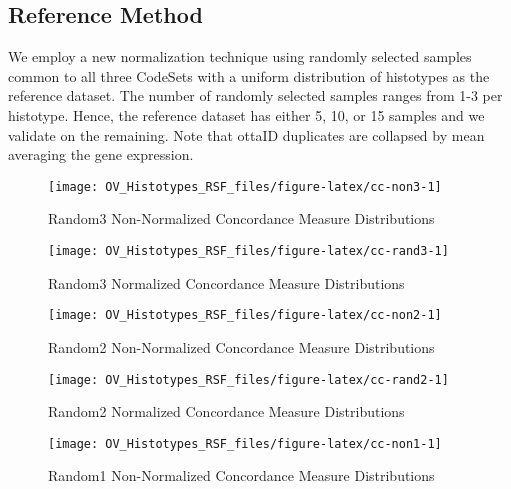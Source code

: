 \documentclass[
]{report}
\begin{document}
\hypertarget{reference-method}{%
\subsection{Reference Method}\label{reference-method}}

We employ a new normalization technique using randomly selected samples common to all three CodeSets with a uniform distribution of histotypes as the reference dataset. The number of randomly selected samples ranges from 1-3 per histotype. Hence, the reference dataset has either 5, 10, or 15 samples and we validate on the remaining. Note that ottaID duplicates are collapsed by mean averaging the gene expression.

\begin{figure}[H]

{\centering \texttt{[image: OV\_Histotypes\_RSF\_files/figure-latex/cc-non3-1]} 

}

\caption{Random3 Non-Normalized Concordance Measure Distributions}\label{fig:cc-non3}
\end{figure}

\begin{figure}[H]

{\centering \texttt{[image: OV\_Histotypes\_RSF\_files/figure-latex/cc-rand3-1]} 

}

\caption{Random3 Normalized Concordance Measure Distributions}\label{fig:cc-rand3}
\end{figure}

\begin{figure}[H]

{\centering \texttt{[image: OV\_Histotypes\_RSF\_files/figure-latex/cc-non2-1]} 

}

\caption{Random2 Non-Normalized Concordance Measure Distributions}\label{fig:cc-non2}
\end{figure}

\begin{figure}[H]

{\centering \texttt{[image: OV\_Histotypes\_RSF\_files/figure-latex/cc-rand2-1]} 

}

\caption{Random2 Normalized Concordance Measure Distributions}\label{fig:cc-rand2}
\end{figure}

\begin{figure}[H]

{\centering \texttt{[image: OV\_Histotypes\_RSF\_files/figure-latex/cc-non1-1]} 

}

\caption{Random1 Non-Normalized Concordance Measure Distributions}\label{fig:cc-non1}
\end{figure}
\end{document}

